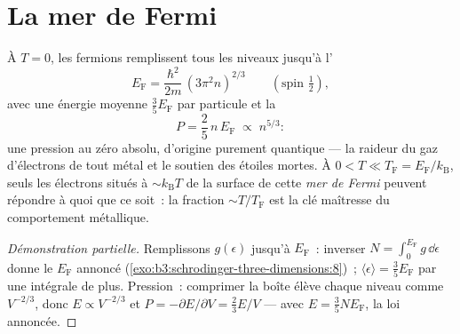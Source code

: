 \section{La mer de Fermi}

\begin{theorem}\label{thm:b3:quantum-statistics:fermi}
À $T = 0$, les fermions remplissent tous les niveaux jusqu'à
l'\emph{}
\[
E_{\text{F}} = \frac{\hbar^2}{2m}\,(3\pi^2n)^{2/3}
\qquad (\text{spin } \tfrac12) ,
\]
avec une énergie moyenne $\tfrac35 E_{\text{F}}$ par particule et la
\emph{}
\[
P = \frac25\,n\,E_{\text{F}} \;\propto\; n^{5/3} :
\]
une pression au zéro absolu, d'origine purement quantique --- la
raideur du gaz d'électrons de tout métal et le soutien des étoiles
mortes. À $0 < T \ll T_{\text{F}} = E_{\text{F}}/k_{\text{B}}$, seuls
les électrons situés à $\sim k_{\text{B}}T$ de la surface de cette
\emph{mer de Fermi} peuvent répondre à quoi que ce soit~: la fraction
$\sim T/T_{\text{F}}$ est la clé maîtresse du comportement métallique.
\end{theorem}

\begin{proof}[Démonstration partielle]
Remplissons $g(\epsilon)$ jusqu'à $E_{\text{F}}$~: inverser $N = \int_0^{
E_{\text{F}}}g\,\dd\epsilon$ donne le $E_{\text{F}}$ annoncé
(\cref{exo:b3:schrodinger-three-dimensions:8})~; $\langle\epsilon
\rangle = \tfrac35 E_{\text{F}}$ par une intégrale de plus. Pression~:
comprimer la boîte élève chaque niveau comme $V^{-2/3}$, donc $E
\propto V^{-2/3}$ et $P = -\partial E/\partial V = \tfrac23 E/V$
--- avec $E = \tfrac35 NE_{\text{F}}$, la loi annoncée.
\end{proof}

